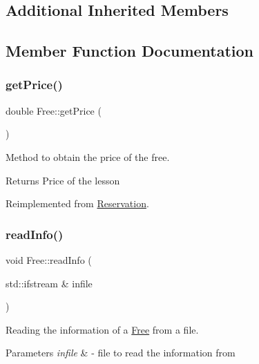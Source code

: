 \subsection*{Additional Inherited Members}


\subsection{Member Function Documentation}
\mbox{\label{class_free_a229f009a7535eeba0a6ff4495de8c6bf}} 
\subsubsection{\texorpdfstring{get\+Price()}{getPrice()}}
{\footnotesize\ttfamily double Free\+::get\+Price (\begin{DoxyParamCaption}{ }\end{DoxyParamCaption})\hspace{0.3cm}{\ttfamily [virtual]}}



Method to obtain the price of the free. 

\begin{DoxyReturn}{Returns}
Price of the lesson 
\end{DoxyReturn}


Reimplemented from \mbox{\hyperlink{class_reservation_a62cdb2f1a24e2fce92fb9f024ae9f494}{Reservation}}.

\mbox{\label{class_free_ad1023c825c9790edf0797e2e69dd2fcf}} 
\subsubsection{\texorpdfstring{read\+Info()}{readInfo()}}
{\footnotesize\ttfamily void Free\+::read\+Info (\begin{DoxyParamCaption}\item[{std\+::ifstream \&}]{infile }\end{DoxyParamCaption})\hspace{0.3cm}{\ttfamily [virtual]}}



Reading the information of a \mbox{\hyperlink{class_free}{Free}} from a file. 


\begin{DoxyParams}{Parameters}
{\em infile} & -\/ file to read the information from \\
\hline
\end{DoxyParams}


